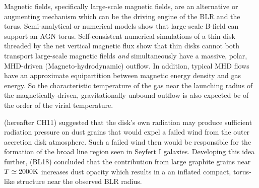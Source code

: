 \documentclass[12pt,english,preprint]{aastex}
\begin{document}
Magnetic fields, specifically large-scale magnetic fields, 
are an alternative or augmenting mechanism which can be the driving engine of the BLR and the torus. 
Semi-analytical or numerical models \citep{Lovelace98,Dorodnitsyn16} 
show that large-scale B-field can support an AGN torus. 
Self-consistent numerical simulations of a 
thin disk threaded by the net vertical magnetic flux \citep{ZhuStone2018} 
show that thin disks cannot both transport large-scale magnetic fields 
\citep{LubowPapaloizou94,BKLovelace2000,BKLovelace2007} \emph{and} simultaneously have a 
massive, polar, MHD-driven (Magneto-hydrodynamic) outflow. 
In addition,  typical MHD flows have an approximate equipartition between magnetic energy density and 
gas energy. So the characteristic temperature of the gas near the launching radius of the magnetically-driven, 
gravitationally unbound outflow is also expected be of the order of the virial temperature.





% 













\citet{CzernyHryniewicz11}(hereafter CH11) suggested that the disk's own radiation may produce sufficient
radiation pressure on dust grains that would expel a failed wind from the outer accretion disk atmosphere. 
Such a failed wind then would be responsible for the formation of the broad line region seen
in Seyfert I galaxies. Developing this idea further, \citet{BaskinLaor2018MNRAS}
(BL18) concluded that the contribution from large graphite grains
near $T\simeq2000{\rm K}$ increases dust opacity which results in
a an inflated compact, torus-like structure near the observed BLR radius. 
\end{document}
